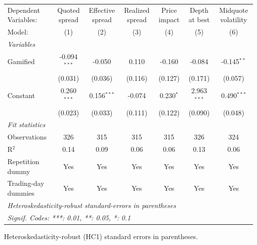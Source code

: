 \begingroup
\centering
\begin{tabular}{lcccccc}
   \tabularnewline \midrule \midrule
   Dependent Variables: & Quoted spread  & Effective spread & Realized spread & Price impact & Depth at best & Midquote volatility\\  
   Model:               & (1)            & (2)              & (3)             & (4)          & (5)           & (6)\\  
   \midrule
   \emph{Variables}\\
   Gamified             & -0.094$^{***}$ & -0.050           & 0.110           & -0.160       & -0.084        & -0.145$^{**}$\\   
                        & (0.031)        & (0.036)          & (0.116)         & (0.127)      & (0.171)       & (0.057)\\   
   Constant             & 0.260$^{***}$  & 0.156$^{***}$    & -0.074          & 0.230$^{*}$  & 2.963$^{***}$ & 0.490$^{***}$\\   
                        & (0.023)        & (0.033)          & (0.111)         & (0.122)      & (0.090)       & (0.048)\\   
   \midrule
   \emph{Fit statistics}\\
   Observations         & 326            & 315              & 315             & 315          & 326           & 324\\  
   R$^2$                & 0.14           & 0.09             & 0.06            & 0.06         & 0.13          & 0.06\\  
   Repetition dummy     & Yes            & Yes              & Yes             & Yes          & Yes           & Yes\\  
   Trading-day dummies  & Yes            & Yes              & Yes             & Yes          & Yes           & Yes\\  
   \midrule \midrule
   \multicolumn{7}{l}{\emph{Heteroskedasticity-robust standard-errors in parentheses}}\\
   \multicolumn{7}{l}{\emph{Signif. Codes: ***: 0.01, **: 0.05, *: 0.1}}\\
\end{tabular}
 
\par \raggedright 
Heteroskedasticity-robust (HC1) standard errors in parentheses.
\par\endgroup
